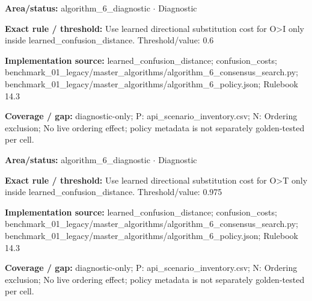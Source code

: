 \begin{tcolorbox}[enhanced,breakable,colback=white,colframe=Muted!45,boxrule=0.45pt,arc=1.5pt,left=6pt,right=6pt,top=5pt,bottom=5pt,title={\texttt{A6-LEARNED-SUBSTITUTION-O-I}},title after break={\texttt{A6-LEARNED-SUBSTITUTION-O-I}\ (continued)},fonttitle=\headingfont\bfseries\color{Navy},coltitle=Navy]
\textbf{Area/status:} algorithm\_\allowbreak{}6\_\allowbreak{}diagnostic $\boldsymbol{\cdot}$ Diagnostic\par
\smallskip
\textbf{Exact rule / threshold:} Use learned directional substitution cost for O>I only inside learned\_\allowbreak{}confusion\_\allowbreak{}distance. Threshold/\allowbreak{}value: 0.6\par
\smallskip
\textbf{Implementation source:} learned\_\allowbreak{}confusion\_\allowbreak{}distance; confusion\_\allowbreak{}costs; benchmark\_\allowbreak{}01\_\allowbreak{}legacy/\allowbreak{}master\_\allowbreak{}algorithms/\allowbreak{}algorithm\_\allowbreak{}6\_\allowbreak{}consensus\_\allowbreak{}search.py; benchmark\_\allowbreak{}01\_\allowbreak{}legacy/\allowbreak{}master\_\allowbreak{}algorithms/\allowbreak{}algorithm\_\allowbreak{}6\_\allowbreak{}policy.json; Rulebook 14.3\par
\smallskip
\textbf{Coverage / gap:} diagnostic-only; P: api\_\allowbreak{}scenario\_\allowbreak{}inventory.csv; N: Ordering exclusion; No live ordering effect; policy metadata is not separately golden-tested per cell.
\end{tcolorbox}
\begin{tcolorbox}[enhanced,breakable,colback=white,colframe=Muted!45,boxrule=0.45pt,arc=1.5pt,left=6pt,right=6pt,top=5pt,bottom=5pt,title={\texttt{A6-LEARNED-SUBSTITUTION-O-T}},title after break={\texttt{A6-LEARNED-SUBSTITUTION-O-T}\ (continued)},fonttitle=\headingfont\bfseries\color{Navy},coltitle=Navy]
\textbf{Area/status:} algorithm\_\allowbreak{}6\_\allowbreak{}diagnostic $\boldsymbol{\cdot}$ Diagnostic\par
\smallskip
\textbf{Exact rule / threshold:} Use learned directional substitution cost for O>T only inside learned\_\allowbreak{}confusion\_\allowbreak{}distance. Threshold/\allowbreak{}value: 0.975\par
\smallskip
\textbf{Implementation source:} learned\_\allowbreak{}confusion\_\allowbreak{}distance; confusion\_\allowbreak{}costs; benchmark\_\allowbreak{}01\_\allowbreak{}legacy/\allowbreak{}master\_\allowbreak{}algorithms/\allowbreak{}algorithm\_\allowbreak{}6\_\allowbreak{}consensus\_\allowbreak{}search.py; benchmark\_\allowbreak{}01\_\allowbreak{}legacy/\allowbreak{}master\_\allowbreak{}algorithms/\allowbreak{}algorithm\_\allowbreak{}6\_\allowbreak{}policy.json; Rulebook 14.3\par
\smallskip
\textbf{Coverage / gap:} diagnostic-only; P: api\_\allowbreak{}scenario\_\allowbreak{}inventory.csv; N: Ordering exclusion; No live ordering effect; policy metadata is not separately golden-tested per cell.
\end{tcolorbox}
